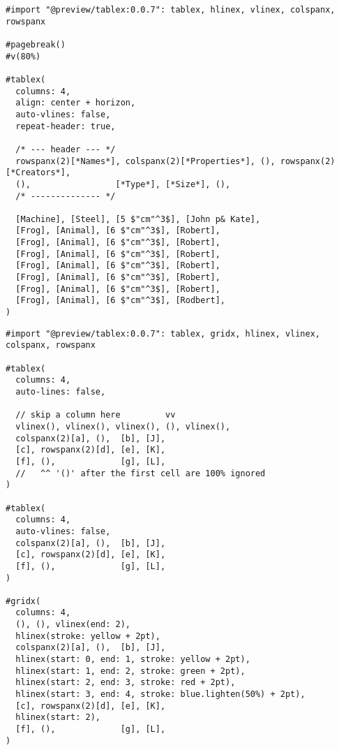 \begin{verbatim}
#import "@preview/tablex:0.0.7": tablex, hlinex, vlinex, colspanx, rowspanx

#pagebreak()
#v(80%)

#tablex(
  columns: 4,
  align: center + horizon,
  auto-vlines: false,
  repeat-header: true,

  /* --- header --- */
  rowspanx(2)[*Names*], colspanx(2)[*Properties*], (), rowspanx(2)[*Creators*],
  (),                 [*Type*], [*Size*], (),
  /* -------------- */

  [Machine], [Steel], [5 $"cm"^3$], [John p& Kate],
  [Frog], [Animal], [6 $"cm"^3$], [Robert],
  [Frog], [Animal], [6 $"cm"^3$], [Robert],
  [Frog], [Animal], [6 $"cm"^3$], [Robert],
  [Frog], [Animal], [6 $"cm"^3$], [Robert],
  [Frog], [Animal], [6 $"cm"^3$], [Robert],
  [Frog], [Animal], [6 $"cm"^3$], [Robert],
  [Frog], [Animal], [6 $"cm"^3$], [Rodbert],
)
\end{verbatim}

\pandocbounded{}

\pandocbounded{}

\begin{verbatim}
#import "@preview/tablex:0.0.7": tablex, gridx, hlinex, vlinex, colspanx, rowspanx

#tablex(
  columns: 4,
  auto-lines: false,

  // skip a column here         vv
  vlinex(), vlinex(), vlinex(), (), vlinex(),
  colspanx(2)[a], (),  [b], [J],
  [c], rowspanx(2)[d], [e], [K],
  [f], (),             [g], [L],
  //   ^^ '()' after the first cell are 100% ignored
)

#tablex(
  columns: 4,
  auto-vlines: false,
  colspanx(2)[a], (),  [b], [J],
  [c], rowspanx(2)[d], [e], [K],
  [f], (),             [g], [L],
)

#gridx(
  columns: 4,
  (), (), vlinex(end: 2),
  hlinex(stroke: yellow + 2pt),
  colspanx(2)[a], (),  [b], [J],
  hlinex(start: 0, end: 1, stroke: yellow + 2pt),
  hlinex(start: 1, end: 2, stroke: green + 2pt),
  hlinex(start: 2, end: 3, stroke: red + 2pt),
  hlinex(start: 3, end: 4, stroke: blue.lighten(50%) + 2pt),
  [c], rowspanx(2)[d], [e], [K],
  hlinex(start: 2),
  [f], (),             [g], [L],
)
\end{verbatim}

